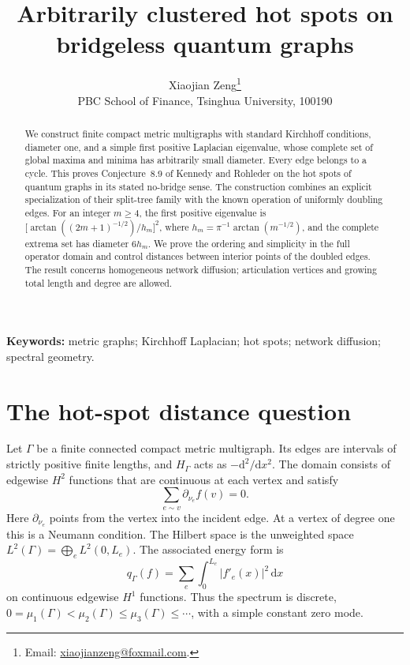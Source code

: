 \documentclass[11pt]{article}
\title{Arbitrarily clustered hot spots on bridgeless quantum graphs}
\author{Xiaojian Zeng\thanks{Email: \href{mailto:xiaojianzeng@foxmail.com}{xiaojianzeng@foxmail.com}.}\\
  \small PBC School of Finance, Tsinghua University, 100190}
\date{}
\numberwithin{equation}{section}
\theoremstyle{remark}
\newcommand{\dd}{\,\mathrm{d}}
\begin{document}
\maketitle

\begin{abstract}
We construct finite compact metric multigraphs with standard Kirchhoff
conditions, diameter one, and a simple first positive Laplacian eigenvalue,
whose complete set of global maxima and minima has arbitrarily small
diameter. Every edge belongs to a cycle. This proves Conjecture~8.9 of
Kennedy and Rohleder on the hot spots of quantum graphs in its stated
no-bridge sense. The construction combines an explicit specialization of
their split-tree family with the known operation of uniformly doubling
edges. For an integer \(m\geq4\), the first positive eigenvalue is
\(\bigl[\arctan((2m+1)^{-1/2})/h_m\bigr]^2\), where
\(h_m=\pi^{-1}\arctan(m^{-1/2})\), and the complete extrema set has
diameter \(6h_m\). We prove the ordering and simplicity in the full
operator domain and control distances between interior points of the
doubled edges. The result concerns homogeneous network diffusion;
articulation vertices and growing total length and degree are allowed.
\end{abstract}

\noindent\textbf{Keywords:} metric graphs; Kirchhoff Laplacian; hot spots;
network diffusion; spectral geometry.

\section{The hot-spot distance question}

Let \(\Gamma\) be a finite connected compact metric multigraph.
Its edges are intervals of strictly positive finite lengths,
and \(H_\Gamma\) acts as \(-\mathrm{d}^2/\mathrm{d}x^2\).
The domain consists of edgewise \(H^2\) functions that are continuous
at each vertex and satisfy
\begin{equation}\label{eq:kirchhoff}
  \sum_{e\sim v}\partial_{\nu_e}f(v)=0.
\end{equation}
Here \(\partial_{\nu_e}\) points from the vertex into the incident edge.
At a vertex of degree one this is a Neumann condition.
The Hilbert space is the unweighted space
\(L^2(\Gamma)=\bigoplus_e L^2(0,L_e)\).
The associated energy form is
\[
  q_\Gamma(f)=\sum_e\int_0^{L_e}|f'_e(x)|^2\dd x
\]
on continuous edgewise \(H^1\) functions. Thus the spectrum is discrete,
\(0=\mu_1(\Gamma)<\mu_2(\Gamma)\leq\mu_3(\Gamma)\leq\cdots\),
with a simple constant zero mode.
\end{document}
